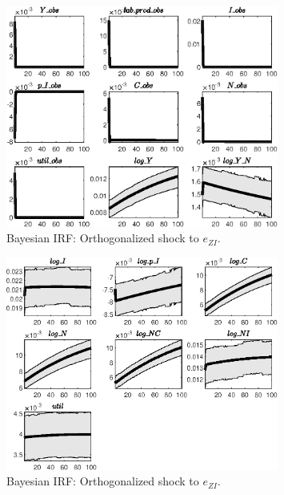 \begin{figure}[H]
\centering 
\includegraphics[width=0.80\textwidth]{BRS_imp_mobility_alt/Output/BRS_imp_mobility_alt_Bayesian_IRF_e_ZI_1}
\caption{Bayesian IRF: Orthogonalized shock to ${e_{ZI}}$.}
\label{Fig:BayesianIRF:e_ZI:1}
\end{figure}
 
\begin{figure}[H]
\centering 
\includegraphics[width=0.80\textwidth]{BRS_imp_mobility_alt/Output/BRS_imp_mobility_alt_Bayesian_IRF_e_ZI_2}
\caption{Bayesian IRF: Orthogonalized shock to ${e_{ZI}}$.}
\label{Fig:BayesianIRF:e_ZI:2}
\end{figure}
 
